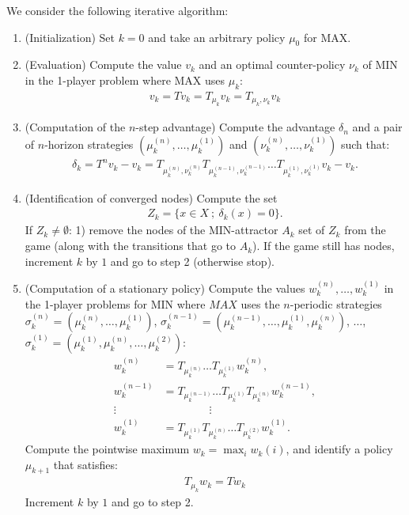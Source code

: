 \documentclass{article}
\begin{document}
We consider the following iterative algorithm:
\begin{enumerate}
\item (Initialization) Set $k=0$ and take an arbitrary policy $\mu_0$ for MAX.
\item (Evaluation) Compute the value $v_k$ and an optimal counter-policy $\nu_k$ of MIN in the 1-player problem  where MAX uses $\mu_k$:
  \begin{align}
    v_k = T v_k = T_{\mu_k} v_k = T_{\mu_k,\nu_k} v_k
  \end{align}
\item (Computation of the $n$-step advantage) Compute the advantage $\delta_n$ and a pair of $n$-horizon strategies $(\mu_k^{(n)},\dots,\mu_k^{(1)})$ and $(\nu_k^{(n)},\dots,\nu_k^{(1)})$ such that:
  \begin{align}
    \delta_k = T^n v_k - v_k = T_{\mu_k^{(n)},\nu_k^{(n)}} T_{\mu_k^{(n-1)},\nu_k^{(n-1)}} \dots  T_{\mu_k^{(1)},\nu_k^{(1)}}v_k - v_k.
  \end{align}
\item (Identification of converged nodes) Compute the set
  \begin{align}
    Z_k = \{ x \in X ~;~ \delta_k(x)=0 \}.
  \end{align}
  If $Z_k \neq \emptyset$: 1) remove the nodes of the MIN-attractor $A_k$ set of $Z_k$ from the game (along with the transitions that go to $A_k$).  If the game still has nodes, increment $k$ by $1$ and go to step 2 (otherwise stop). 
\item (Computation of a stationary policy) Compute the values $w_k^{(n)},\dots,w_k^{(1)}$ in the 1-player problems for MIN where $MAX$ uses the $n$-periodic strategies $\sigma_k^{(n)} = (\mu_k^{(n)},\dots,\mu_k^{(1)})$, $\sigma_k^{(n-1)} = (\mu_k^{(n-1)},\dots,\mu_k^{(1)},\mu_k^{(n)})$, $\dots$, $\sigma_k^{(1)}=(\mu_k^{(1)},\mu_k^{(n)},\dots,\mu_k^{(2)})$:
  \begin{align}
    w_k^{(n)} &= T_{\mu_k^{(n)}} \dots T_{\mu_k^{(1)}} w_k^{(n)}, \\
    w_k^{(n-1)} &= T_{\mu_k^{(n-1)}} \dots T_{\mu_k^{(1)}} T_{\mu_k^{(n)}} w_k^{(n-1)}, \\
    \vdots ~~~~ & ~~~~~~~~~~~~~~~~~~~ \vdots \\
    w_k^{(1)} &= T_{\mu_k^{(1)}} T_{\mu_k^{(n)}} \dots T_{\mu_k^{(2)}}  w_k^{(1)}.
  \end{align}
  Compute the pointwise maximum $w_k=\max_{i}w_k{(i)}$, and 
  identify a policy $\mu_{k+1}$ that satisfies:
  \begin{align}
    T_{\mu_k} w_k = T w_k
  \end{align}
  Increment $k$ by $1$ and go to step 2.
\end{enumerate}
\end{document}
